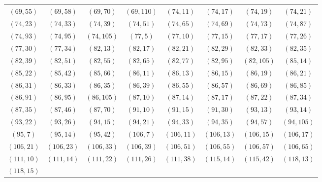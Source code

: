 \documentclass[11pt,reqno]{amsart}
\theoremstyle{definition}
\begin{document}
\begin{longtable}{|c|c|c|c|c|c|c|c|}
$ ( 69 , 55 )$
 & 
$ ( 69 , 58 )$
 & 
$ ( 69 , 70 )$
 & 
$ ( 69 , 110 )$
 & 
$ ( 74 , 11 )$
 & 
$ ( 74 , 17 )$
 & 
$ ( 74 , 19 )$
 & 
$ ( 74 , 21 )$
\\ \hline
$ ( 74 , 23 )$
 & 
$ ( 74 , 33 )$
 & 
$ ( 74 , 39 )$
 & 
$ ( 74 , 51 )$
 & 
$ ( 74 , 65 )$
 & 
$ ( 74 , 69 )$
 & 
$ ( 74 , 73 )$
 & 
$ ( 74 , 87 )$
\\ \hline
$ ( 74 , 93 )$
 & 
$ ( 74 , 95 )$
 & 
$ ( 74 , 105 )$
 & 
$ ( 77 , 5 )$
 & 
$ ( 77 , 10 )$
 & 
$ ( 77 , 15 )$
 & 
$ ( 77 , 17 )$
 & 
$ ( 77 , 26 )$
\\ \hline
$ ( 77 , 30 )$
 & 
$ ( 77 , 34 )$
 & 
$ ( 82 , 13 )$
 & 
$ ( 82 , 17 )$
 & 
$ ( 82 , 21 )$
 & 
$ ( 82 , 29 )$
 & 
$ ( 82 , 33 )$
 & 
$ ( 82 , 35 )$
\\ \hline
$ ( 82 , 39 )$
 & 
$ ( 82 , 51 )$
 & 
$ ( 82 , 55 )$
 & 
$ ( 82 , 65 )$
 & 
$ ( 82 , 77 )$
 & 
$ ( 82 , 95 )$
 & 
$ ( 82 , 105 )$
 & 
$ ( 85 , 14 )$
\\ \hline
$ ( 85 , 22 )$
 & 
$ ( 85 , 42 )$
 & 
$ ( 85 , 66 )$
 & 
$ ( 86 , 11 )$
 & 
$ ( 86 , 13 )$
 & 
$ ( 86 , 15 )$
 & 
$ ( 86 , 19 )$
 & 
$ ( 86 , 21 )$
\\ \hline
$ ( 86 , 31 )$
 & 
$ ( 86 , 33 )$
 & 
$ ( 86 , 35 )$
 & 
$ ( 86 , 39 )$
 & 
$ ( 86 , 55 )$
 & 
$ ( 86 , 57 )$
 & 
$ ( 86 , 69 )$
 & 
$ ( 86 , 85 )$
\\ \hline
$ ( 86 , 91 )$
 & 
$ ( 86 , 95 )$
 & 
$ ( 86 , 105 )$
 & 
$ ( 87 , 10 )$
 & 
$ ( 87 , 14 )$
 & 
$ ( 87 , 17 )$
 & 
$ ( 87 , 22 )$
 & 
$ ( 87 , 34 )$
\\ \hline
$ ( 87 , 35 )$
 & 
$ ( 87 , 46 )$
 & 
$ ( 87 , 70 )$
 & 
$ ( 91 , 10 )$
 & 
$ ( 91 , 15 )$
 & 
$ ( 91 , 30 )$
 & 
$ ( 93 , 13 )$
 & 
$ ( 93 , 14 )$
\\ \hline
$ ( 93 , 22 )$
 & 
$ ( 93 , 26 )$
 & 
$ ( 94 , 15 )$
 & 
$ ( 94 , 21 )$
 & 
$ ( 94 , 33 )$
 & 
$ ( 94 , 35 )$
 & 
$ ( 94 , 57 )$
 & 
$ ( 94 , 105 )$
\\ \hline
$ ( 95 , 7 )$
 & 
$ ( 95 , 14 )$
 & 
$ ( 95 , 42 )$
 & 
$ ( 106 , 7 )$
 & 
$ ( 106 , 11 )$
 & 
$ ( 106 , 13 )$
 & 
$ ( 106 , 15 )$
 & 
$ ( 106 , 17 )$
\\ \hline
$ ( 106 , 21 )$
 & 
$ ( 106 , 23 )$
 & 
$ ( 106 , 33 )$
 & 
$ ( 106 , 39 )$
 & 
$ ( 106 , 51 )$
 & 
$ ( 106 , 55 )$
 & 
$ ( 106 , 57 )$
 & 
$ ( 106 , 65 )$
\\ \hline
$ ( 111 , 10 )$
 & 
$ ( 111 , 14 )$
 & 
$ ( 111 , 22 )$
 & 
$ ( 111 , 26 )$
 & 
$ ( 111 , 38 )$
 & 
$ ( 115 , 14 )$
 & 
$ ( 115 , 42 )$
 & 
$ ( 118 , 13 )$
\\ \hline
$ ( 118 , 15 )$

\end{longtable}
\end{document}
